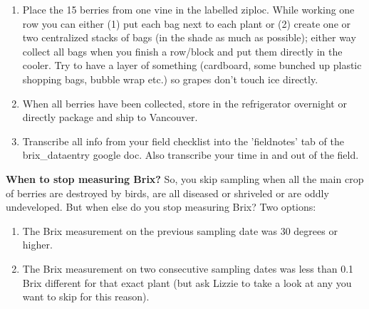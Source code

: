 \documentclass[11pt,letter]{article}
\begin{document}
\begin{enumerate}
\item Place the 15 berries from one vine in the labelled ziploc. While working one row you can either (1) put each bag next to each plant or (2) create one or two centralized stacks of bags (in the shade as much as possible); either way collect all bags when you finish a row/block and put them directly in the cooler. Try to have a layer of something (cardboard, some bunched up plastic shopping bags, bubble wrap etc.) so grapes don’t touch ice directly. 

\item When all berries have been collected, store in the refrigerator overnight or directly package and ship to Vancouver.

\item Transcribe all info from your field checklist into the 'fieldnotes' tab of the brix\_dataentry google doc. Also transcribe your time in and out of the field. 

\end{enumerate}

{\bf When to stop measuring Brix?}
So, you skip sampling when all the main crop of berries are destroyed by birds, are all diseased or shriveled or are oddly undeveloped. But when else do you stop measuring Brix? Two options:
\begin{enumerate}
\item The Brix measurement on the previous sampling date was 30 degrees or higher.
\item The Brix measurement on two consecutive sampling dates was less than 0.1 Brix different for that exact plant (but ask Lizzie to take a look at any you want to skip for this reason).
\end{enumerate}
\end{document}
